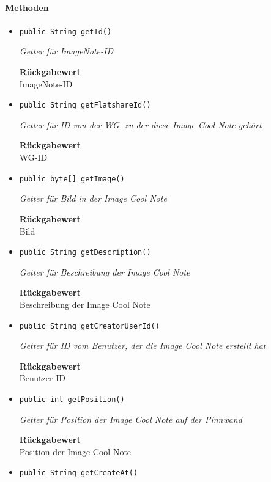     \paragraph*{Methoden}
    \begin{itemize}
    	\item{\texttt{public String getId()}}
    	
    	\textit{Getter für ImageNote-ID}
    	
    	
    	
    	\textbf{Rückgabewert} \\
    	ImageNote-ID        \item{\texttt{public String getFlatshareId()}}
    	
    	\textit{Getter für ID von der WG, zu der diese Image Cool Note gehört}
    	
    	
    	
    	\textbf{Rückgabewert} \\
    	WG-ID        \item{\texttt{public byte[] getImage()}}
    	
    	\textit{Getter für Bild in der Image Cool Note}
    	
    	
    	
    	\textbf{Rückgabewert} \\
    	Bild        \item{\texttt{public String getDescription()}}
    	
    	\textit{Getter für Beschreibung der Image Cool Note}
    	
    	
    	
    	\textbf{Rückgabewert} \\
    	Beschreibung der Image Cool Note        \item{\texttt{public String getCreatorUserId()}}
    	
    	\textit{Getter für ID vom Benutzer, der die Image Cool Note erstellt hat}
    	
    	
    	
    	\textbf{Rückgabewert} \\
    	Benutzer-ID        \item{\texttt{public int getPosition()}}
    	
    	\textit{Getter für Position der Image Cool Note auf der Pinnwand}
    	
    	
    	
    	\textbf{Rückgabewert} \\
    	Position der Image Cool Note        \item{\texttt{public String getCreateAt()}}
    	

\end{itemize}

